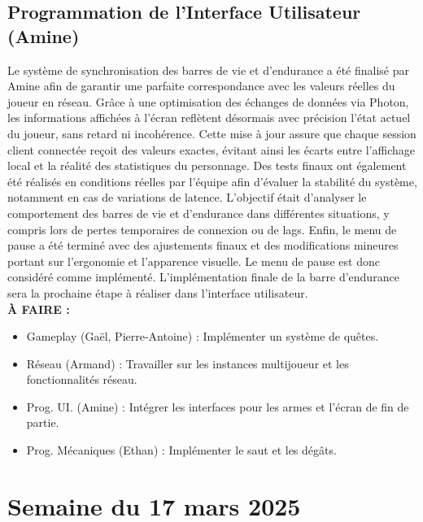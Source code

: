 \documentclass{report}
\begin{document}
\subsection*{Programmation de l'Interface Utilisateur (Amine)}
Le système de synchronisation des barres de vie et d’endurance a été finalisé par Amine afin de garantir une parfaite correspondance avec les valeurs réelles du joueur en réseau. Grâce à une optimisation des échanges de données via Photon, les informations affichées à l’écran reflètent désormais avec précision l’état actuel du joueur, sans retard ni incohérence. Cette mise à jour assure que chaque session client connectée reçoit des valeurs exactes, évitant ainsi les écarts entre l’affichage local et la réalité des statistiques du personnage. Des tests finaux ont également été réalisés en conditions réelles par l'équipe afin d’évaluer la stabilité du système, notamment en cas de variations de latence. L’objectif était d’analyser le comportement des barres de vie et d’endurance dans différentes situations, y compris lors de pertes temporaires de connexion ou de lags. Enfin, le menu de pause a été terminé avec des ajustements finaux et des modifications mineures portant sur l’ergonomie et l’apparence visuelle. Le menu de pause est donc considéré comme implémenté. L'implémentation finale de la barre d'endurance sera la prochaine étape à réaliser dans l'interface utilisateur.
\\[1cm]
\textbf{À FAIRE :}
\begin{itemize}
    \item Gameplay (Gaël, Pierre-Antoine) : Implémenter un système de quêtes.
    \item Réseau (Armand) : Travailler sur les instances multijoueur et les fonctionnalités réseau.
    \item Prog. UI. (Amine) : Intégrer les interfaces pour les armes et l’écran de fin de partie.
    \item Prog. Mécaniques (Ethan) : Implémenter le saut et les dégâts.
\end{itemize}


\newpage
\section{Semaine du 17 mars 2025}
\end{document}
